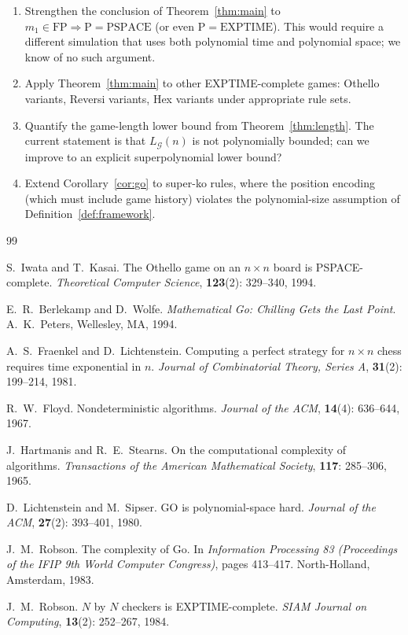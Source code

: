 \documentclass[11pt,a4paper]{amsart}
\theoremstyle{plain}
\theoremstyle{definition}
\theoremstyle{remark}
\newcommand{\FP}{\mathrm{FP}}
\newcommand{\PTIME}{\mathrm{P}}
\newcommand{\EXPTIME}{\mathrm{EXPTIME}}
\newcommand{\PSPACE}{\mathrm{PSPACE}}
\begin{document}
\begin{enumerate}[nosep]
  \item Strengthen the conclusion of Theorem~\ref{thm:main} to
        $m_1 \in \FP \Rightarrow \PTIME = \PSPACE$ (or even
        $\PTIME = \EXPTIME$). This would require a different
        simulation that uses both polynomial time and polynomial
        space; we know of no such argument.
  \item Apply Theorem~\ref{thm:main} to other EXPTIME-complete games:
        Othello variants, Reversi variants, Hex variants under
        appropriate rule sets.
  \item Quantify the game-length lower bound from
        Theorem~\ref{thm:length}. The current statement is that
        $L_\mathcal{G}(n)$ is not polynomially bounded; can we
        improve to an explicit superpolynomial lower bound?
  \item Extend Corollary~\ref{cor:go} to super-ko rules, where the
        position encoding (which must include game history) violates
        the polynomial-size assumption of
        Definition~\ref{def:framework}.
\end{enumerate}

\begin{thebibliography}{99}

S.~Iwata and T.~Kasai.
\newblock The Othello game on an $n \times n$ board is PSPACE-complete.
\newblock \emph{Theoretical Computer Science}, \textbf{123}(2):
  329--340, 1994.

E.~R.~Berlekamp and D.~Wolfe.
\newblock \emph{Mathematical Go: Chilling Gets the Last Point}.
\newblock A.~K.~Peters, Wellesley, MA, 1994.

A.~S.~Fraenkel and D.~Lichtenstein.
\newblock Computing a perfect strategy for $n \times n$ chess
  requires time exponential in $n$.
\newblock \emph{Journal of Combinatorial Theory, Series A},
  \textbf{31}(2): 199--214, 1981.

R.~W.~Floyd.
\newblock Nondeterministic algorithms.
\newblock \emph{Journal of the ACM}, \textbf{14}(4): 636--644, 1967.

J.~Hartmanis and R.~E.~Stearns.
\newblock On the computational complexity of algorithms.
\newblock \emph{Transactions of the American Mathematical Society},
  \textbf{117}: 285--306, 1965.

D.~Lichtenstein and M.~Sipser.
\newblock GO is polynomial-space hard.
\newblock \emph{Journal of the ACM}, \textbf{27}(2): 393--401, 1980.

J.~M.~Robson.
\newblock The complexity of Go.
\newblock In \emph{Information Processing 83 (Proceedings of the IFIP
  9th World Computer Congress)}, pages 413--417.
  North-Holland, Amsterdam, 1983.

J.~M.~Robson.
\newblock $N$ by $N$ checkers is EXPTIME-complete.
\newblock \emph{SIAM Journal on Computing}, \textbf{13}(2): 252--267,
  1984.

\end{thebibliography}
\end{document}
